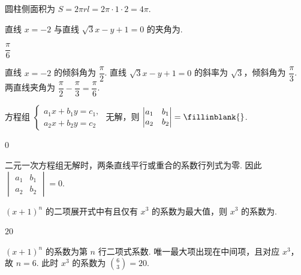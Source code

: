 \begin{solution}
圆柱侧面积为 \(S=2\pi rl=2\pi\cdot1\cdot2=4\pi\).
\end{solution}

\begin{problem}
直线 \(x=-2\) 与直线 \(\sqrt3x-y+1=0\) 的夹角为\fillinblank{}.
\end{problem}

\begin{answer}
\(\dfrac{\pi}{6}\)
\end{answer}

\begin{solution}
直线 \(x=-2\) 的倾斜角为 \(\dfrac{\pi}{2}\). 直线 \(\sqrt3x-y+1=0\) 的斜率为 \(\sqrt3\)，倾斜角为 \(\dfrac{\pi}{3}\). 两直线夹角为 \(\dfrac{\pi}{2}-\dfrac{\pi}{3}=\dfrac{\pi}{6}\).
\end{solution}

\begin{problem}
方程组 \(\begin{cases}
a_1x+b_1y=c_1,\\
a_2x+b_2y=c_2
\end{cases}\) 无解，则 \(\begin{vmatrix}a_1&b_1\\a_2&b_2\end{vmatrix}=\fillinblank{}\).
\end{problem}

\begin{answer}
\(0\)
\end{answer}

\begin{solution}
二元一次方程组无解时，两条直线平行或重合的系数行列式为零. 因此 \(\begin{vmatrix}a_1&b_1\\a_2&b_2\end{vmatrix}=0\).
\end{solution}

\begin{problem}
\((x+1)^n\) 的二项展开式中有且仅有 \(x^3\) 的系数为最大值，则 \(x^3\) 的系数为\fillinblank{}.
\end{problem}

\begin{answer}
\(20\)
\end{answer}

\begin{solution}
\((x+1)^n\) 的系数为第 \(n\) 行二项式系数. 唯一最大项出现在中间项，且对应 \(x^3\)，故 \(n=6\). 此时 \(x^3\) 的系数为 \(\binom63=20\).
\end{solution}

